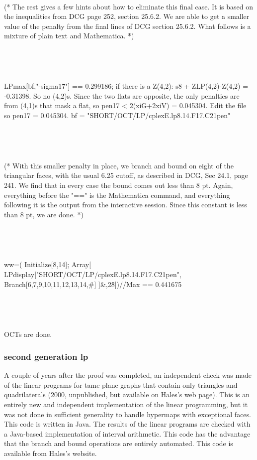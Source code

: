 {\

(* The rest gives a few hints about how to eliminate this final
case.  It is based on the inequalities from DCG page 252, section
25.6.2. We are able to get a smaller value of the penalty from the
final lines of DCG section 25.6.2.  What follows is a mixture of
plain text and Mathematica.  *)

\

\

LPmax[bf,"-sigma{17}"] == 0.299186; if there is a Z(4,2):   s8 +
ZLP(4,2)-Z(4,2) = -0.31398. So no (4,2)s.  Since the two flats are
opposite, the only penalties
    are from (4,1)s that mask a flat, so pen17 < 2(xiG+2xiV) = 0.045304.
    Edit the file so pen17 = 0.045304.
bf = "SHORT/OCT/LP/cplexE.lp8.14.F17.C21pen"

\

\

(* With this smaller penalty in place, we branch and bound on
eight of the triangular faces, with the usual 6.25 cutoff, as
described in DCG, Sec 24.1, page 241. We find that in every case
the bound comes out less than 8 pt. Again, everything before the
"==" is the Mathematica command, and everything following it is
the output from the interactive session.  Since this constant is
less than 8 pt, we are done. *)

\

\

ww=( Initialize[8,14]; Array[
LPdisplay["SHORT/OCT/LP/cplexE.lp8.14.F17.C21pen",
    Branch[{6,7,9,10,11,12,13,14},\#] ]\&,2\^8])//Max ==  0.441675

\

\

OCTs are done.

}




\subsubsection{second generation lp}

A couple of years after the proof was completed, an independent
check was made of the linear programs for tame plane graphs that
contain only triangles and quadrilaterals (2000, unpublished, but
available on Hales's web page). This is an entirely new and
independent implementation of the linear programming, but it was
not done in sufficient generality to handle hypermaps with
exceptional faces. This code is written in Java.  The results of
the linear programs are checked with a Java-based implementation
of interval arithmetic. This code has the advantage that the
branch and bound operations are entirely automated.  This code is
available from Hales's website.

